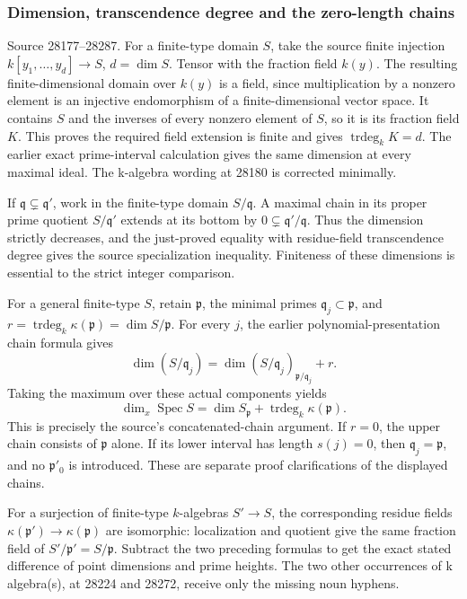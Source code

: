 \subsubsection{Dimension, transcendence degree and the zero-length chains}\label{dimension-transcendence-degree-and-the-zero-length-chains}

Source 28177--28287. For a finite-type domain \(S\), take the source finite injection \(k[y_1,\ldots,y_d]\to S\), \(d=\dim S\). Tensor with the fraction field \(k(y)\). The resulting finite-dimensional domain over \(k(y)\) is a field, since multiplication by a nonzero element is an injective endomorphism of a finite-dimensional vector space. It contains \(S\) and the inverses of every nonzero element of \(S\), so it is its fraction field \(K\). This proves the required field extension is finite and gives \(\operatorname{trdeg}_kK=d\). The earlier exact prime-interval calculation gives the same dimension at every maximal ideal. The k-algebra wording at 28180 is corrected minimally.

If \(\mathfrak q\subsetneq\mathfrak q'\), work in the finite-type domain \(S/\mathfrak q\). A maximal chain in its proper prime quotient \(S/\mathfrak q'\) extends at its bottom by \(0\subsetneq\mathfrak q'/\mathfrak q\). Thus the dimension strictly decreases, and the just-proved equality with residue-field transcendence degree gives the source specialization inequality. Finiteness of these dimensions is essential to the strict integer comparison.

For a general finite-type \(S\), retain \(\mathfrak p\), the minimal primes \(\mathfrak q_j\subset\mathfrak p\), and \(r=\operatorname{trdeg}_k\kappa(\mathfrak p)=\dim S/\mathfrak p\). For every \(j\), the earlier polynomial-presentation chain formula gives \[
 \dim(S/\mathfrak q_j)
   =\dim (S/\mathfrak q_j)_{\mathfrak p/\mathfrak q_j}+r.
\] Taking the maximum over these actual components yields \[
 \dim_x\operatorname{Spec}S
       =\dim S_{\mathfrak p}+\operatorname{trdeg}_k\kappa(\mathfrak p).
\] This is precisely the source's concatenated-chain argument. If \(r=0\), the upper chain consists of \(\mathfrak p\) alone. If its lower interval has length \(s(j)=0\), then \(\mathfrak q_j=\mathfrak p\), and no \(\mathfrak p'_0\) is introduced. These are separate proof clarifications of the displayed chains.

For a surjection of finite-type \(k\)-algebras \(S'\to S\), the corresponding residue fields \(\kappa(\mathfrak p')\to\kappa(\mathfrak p)\) are isomorphic: localization and quotient give the same fraction field of \(S'/\mathfrak p'=S/\mathfrak p\). Subtract the two preceding formulas to get the exact stated difference of point dimensions and prime heights. The two other occurrences of k algebra(s), at 28224 and 28272, receive only the missing noun hyphens.

